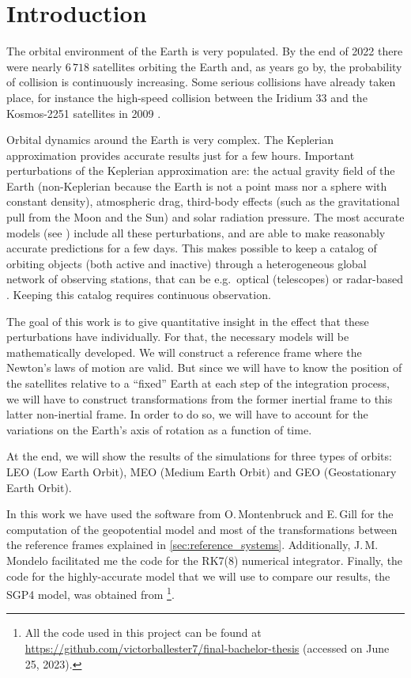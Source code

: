 \documentclass[../main.tex]{subfiles}
\begin{document}
\section{Introduction}\label{sec:intro}

The orbital environment of the Earth is very populated. By the end of 2022 there were nearly $6\,718$ satellites orbiting the Earth \cite{num_sat} and, as years go by, the probability of collision is continuously increasing. Some serious collisions have already taken place, for instance the high-speed collision between the Iridium 33 and the Kosmos-2251 satellites in 2009 \cite{wiki:collision}.

Orbital dynamics around the Earth is very complex. The Keplerian approximation provides accurate results just for a few hours. Important perturbations of the Keplerian approximation are: the actual gravity field of the Earth (non-Keplerian because the Earth is not a point mass nor a sphere with constant density), atmospheric drag, third-body effects (such as the gravitational pull from the Moon and the Sun) and solar radiation pressure. The most accurate models (see \cite{sgp4OrbitDet}) include all these perturbations, and are able to make reasonably accurate predictions for a few days. This makes possible to keep a catalog of orbiting objects (both active and inactive) through a heterogeneous global network of observing stations, that can be e.g.\ optical (telescopes) or radar-based \cite{web:spacetrack,web:celestrak}. Keeping this catalog requires continuous observation.

The goal of this work is to give quantitative insight in the effect that these perturbations have individually. For that, the necessary models will be mathematically developed. We will construct a reference frame where the Newton's laws of motion are valid. But since we will have to know the position of the satellites relative to a ``fixed'' Earth at each step of the integration process, we will have to construct transformations from the former inertial frame to this latter non-inertial frame. In order to do so, we will have to account for the variations on the Earth's axis of rotation as a function of time.

At the end, we will show the results of the simulations for three types of orbits: LEO (Low Earth Orbit), MEO (Medium Earth Orbit) and GEO (Geostationary Earth Orbit).

In this work we have used the software from O.\,Montenbruck and E.\,Gill \cite{montenbruck} for the computation of the geopotential model and most of the transformations between the reference frames explained in \cref{sec:reference_systems}. Additionally, J.\,M.\,Mondelo facilitated me the code for the RK7(8) numerical integrator. Finally, the code for the highly-accurate model that we will use to compare our results, the SGP4 model, was obtained from \cite{code_sgp4}\footnote{All the code used in this project can be found at \url{https://github.com/victorballester7/final-bachelor-thesis} (accessed on June 25, 2023).}.
\end{document}
